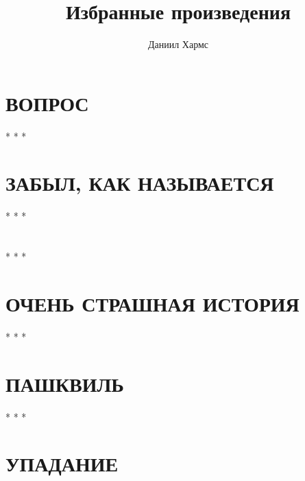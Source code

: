 \documentclass{article}
\title{Избранные произведения}
\author{Даниил Хармс}
\date{}
\begin{document}
\maketitle
\tableofcontents

\newpage
\section{ВОПРОС}


\begin{center}
* * *
\end{center}

\section{ЗАБЫЛ, КАК НАЗЫВАЕТСЯ}


\begin{center}
* * *
\end{center}

\section{}


\begin{center}
* * *
\end{center}

\section{ОЧЕНЬ СТРАШНАЯ ИСТОРИЯ}


\begin{center}
* * *
\end{center}

\section{ПАШКВИЛЬ}


\begin{center}
* * *
\end{center}

\section{УПАДАНИЕ}

\end{document}
